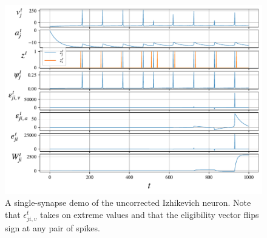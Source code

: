 \begin{figure}[ht]
    \centering
    \includegraphics[width=\linewidth]{gfx/demo_izh}
    \caption{A single-synapse demo of the uncorrected Izhikevich neuron. Note that $\epsilon^t_{ji, v}$ takes on extreme values and that the eligibility vector flips sign at any pair of spikes.}
    \label{fig:demo_izh}
\end{figure}

